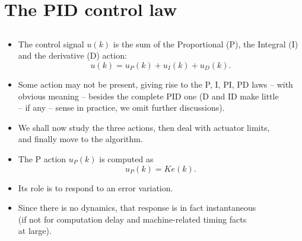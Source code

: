 \section{The PID control law}
\subsection{}

\begin{frame}
\myPause
 \begin{itemize}[<+-| alert@+>]
 \item The control signal $u(k)$ is the sum of the Proportional (P), the Integral (I)\\
       and the derivative (D) action:
       \begin{displaymath}
        u(k) = u_P(k)+u_I(k)+u_D(k).
       \end{displaymath}
 \item Some action may not be present, giving rise to the P, I, PI, PD laws -- with\\
       obvious meaning -- besides the complete PID one (D and ID make little\\
       -- if any -- sense in practice, we omit further discussions).
 \item We shall now study the three actions, then deal with actuator limits,\\
       and finally move to the algorithm.
 \end{itemize}
\end{frame}

\begin{frame}
\framesubtitleTC{}
\myPause
 \begin{itemize}[<+-| alert@+>]
 \item The P action $u_P(k)$ is computed as
       \begin{displaymath}
        u_P(k) = K e(k).
       \end{displaymath}
 \item Its role is to respond  to an error variation.
 \item Since there is no dynamics, that response is in fact instantaneous\\
       (if not for computation delay and machine-related timing facts\\
       at large).
 \end{itemize}
\end{frame}

